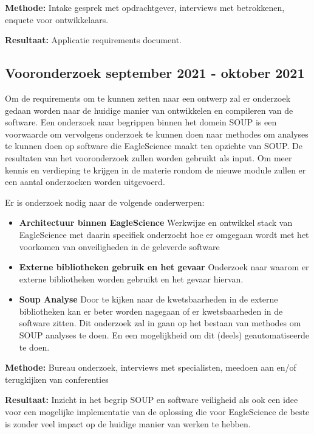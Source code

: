 \textbf{Methode:} Intake gesprek met opdrachtgever, interviews met betrokkenen, enquete voor ontwikkelaars.

\textbf{Resultaat:} Applicatie requirements document.

\subsection{Vooronderzoek \textbf{september 2021 - oktober 2021 }}\label{sec:onderzoek}
Om de requirements om te kunnen zetten naar een ontwerp zal er onderzoek gedaan worden naar de huidige manier van ontwikkelen en compileren van de software. Een onderzoek naar begrippen binnen het domein SOUP is een voorwaarde om vervolgens onderzoek te kunnen doen naar methodes om analyses te kunnen doen op software die EagleScience maakt ten opzichte van SOUP. De resultaten van het vooronderzoek zullen worden gebruikt als input.
Om meer kennis en verdieping te krijgen in de materie rondom de nieuwe module zullen er een aantal onderzoeken worden uitgevoerd.


Er is onderzoek nodig naar de volgende onderwerpen:
\begin{itemize}
    \item \textbf{Architectuur binnen EagleScience} Werkwijze en ontwikkel stack van EagleScience met daarin specifiek onderzocht hoe er omgegaan wordt met het voorkomen van onveiligheden in de geleverde software
    \item \textbf{Externe bibliotheken gebruik en het gevaar} Onderzoek naar waarom er externe bibliotheken worden gebruikt en het gevaar hiervan.
    \item \textbf{Soup Analyse} Door te kijken naar de kwetsbaarheden in de externe bibliotheken kan er beter worden nagegaan of er kwetsbaarheden in de software zitten. Dit onderzoek zal in gaan op het bestaan van methodes om SOUP analyses te doen. En een mogelijkheid om dit (deels) geautomatiseerde te doen.
\end{itemize}

\textbf{Methode:} Bureau onderzoek, interviews met specialisten, meedoen aan en/of terugkijken van conferenties

\textbf{Resultaat:} Inzicht in het begrip SOUP en software veiligheid als ook een idee voor een mogelijke implementatie van de oplossing die voor EagleScience de beste is zonder veel impact op de huidige manier van werken te hebben.


